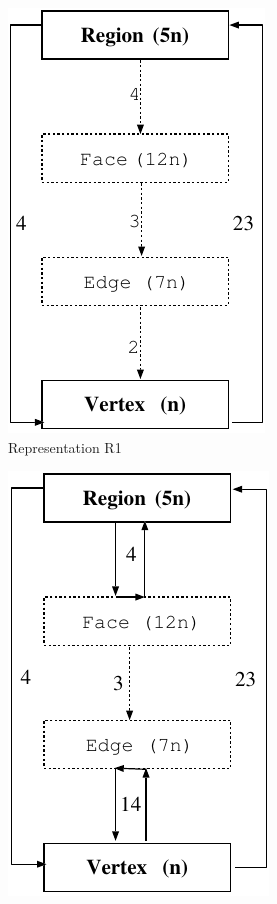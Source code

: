\documentclass[12pt]{article}
\begin{document}
\begin{figure}[!ht]
\begin{center}
    \begin{minipage}{1.75in}
      \begin{center}
        \includegraphics[scale=0.9]{figures/repR1} \\
        Representation R1
      \end{center}
    \end{minipage}
    \begin{minipage}{1.75in}
      \begin{center}
        \includegraphics[scale=0.9]{figures/repR2} \\

\end{center}
\end{minipage}
\end{center}
\end{figure}
\end{document}

